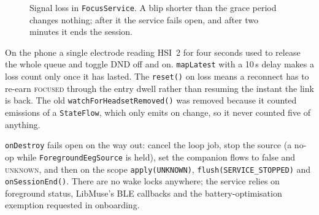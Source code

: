 \documentclass[10pt,a4paper]{article}
\newcommand{\code}[1]{\texttt{#1}}                  %
\newcommand{\state}[1]{\textsc{\small #1}}          %
\begin{document}
\begin{figure}[htbp]\centering
{}
\caption{Signal loss in \code{FocusService}. A blip shorter than the grace period changes nothing;
after it the service fails open, and after two minutes it ends the session.}\label{fig:grace}
\end{figure}

\begin{why}
On the phone a single electrode reading HSI~2 for four seconds used to release the whole queue and
toggle DND off and on. \code{mapLatest} with a 10\,s delay makes a loss count only once it has
lasted. The \code{reset()} on loss means a reconnect has to re-earn \state{focused} through the
entry dwell rather than resuming the instant the link is back. The old
\code{watchForHeadsetRemoved()} was removed because it counted emissions of a \code{StateFlow},
which only emits on change, so it never counted five of anything.
\end{why}

\code{onDestroy} fails open on the way out: cancel the loop job, stop the source (a no-op while
\code{ForegroundEegSource} is held), set the companion flows to false and \state{unknown}, and
then on the scope \code{apply(UNKNOWN)}, \code{flush(SERVICE\_STOPPED)} and
\code{onSessionEnd()}. There are no wake locks anywhere; the service relies on foreground status,
LibMuse's BLE callbacks and the battery-optimisation exemption requested in onboarding.
\end{document}
